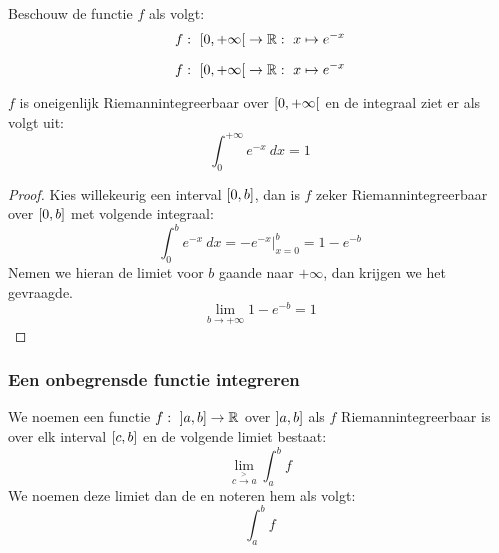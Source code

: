 \documentclass[main.tex]{subfiles}
\begin{document}
\begin{vb}
  Beschouw de functie $f$ als volgt:
  \[ f:\ \interval[open right]{0}{+\infty} \rightarrow \mathbb{R}:\ x \mapsto e^{-x}\]

  \noindent
  \begin{minipage}{.45\textwidth}
    \begin{figure}[H]
      \centering
    \end{figure}
  \end{minipage}
  \begin{minipage}{.45\textwidth}
    \[ f:\ \interval[open right]{0}{+\infty} \rightarrow \mathbb{R}:\ x \mapsto e^{-x}\]
  \end{minipage}

  $f$ is oneigenlijk Riemannintegreerbaar over $\interval[open right]{0}{+\infty}$ en de integraal ziet er als volgt uit:
  \[ \int_{0}^{+\infty}e^{-x}\ dx = 1 \]

  \begin{proof}
    Kies willekeurig een interval $\interval{0}{b}$, dan is $f$ zeker Riemannintegreerbaar over $\interval{0}{b}$ met volgende integraal:
    \[ \int_{0}^{b}e^{-x}\ dx = -e^{-x}\big|_{x=0}^{b} = 1-e^{-b}\]
    Nemen we hieran de limiet voor $b$ gaande naar $+\infty$, dan krijgen we het gevraagde.
    \[ \lim_{b\rightarrow +\infty}1-e^{-b} = 1 \]
  \end{proof}
\end{vb}


\subsubsection{Een onbegrensde functie integreren}
\label{sec:een-onbegr-funct}

\begin{de}
  We noemen een functie $f:\ \interval[open left]{a}{b} \rightarrow \mathbb{R}$   over $\interval[open left]{a}{b}$ als $f$ Riemannintegreerbaar is over elk interval $\interval{c}{b}$ en de volgende limiet bestaat:
  \[ \lim_{c\overset{>}{\rightarrow} a}\int_{a}^{b}f \]
  We noemen deze limiet dan de  en noteren hem als volgt:
  \[ \int_{a}^{b}f \]
\end{de}
\end{document}
